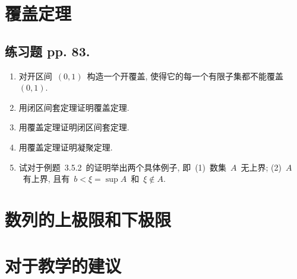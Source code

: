 \documentclass[UTF8,a4paper,11pt,twoside]{book}
\begin{document}
\section{覆盖定理}
\subsection{练习题 pp. 83.}
\begin{enumerate}
	\item 对开区间~$(0,1)$~构造一个开覆盖, 使得它的每一个有限子集都不能覆盖~$(0,1)$.

	\item 用闭区间套定理证明覆盖定理.

	\item 用覆盖定理证明闭区间套定理.

	\item 用覆盖定理证明凝聚定理.

	\item 试对于例题~3.5.2~的证明举出两个具体例子, 即~(1)~数集~$A$~无上界; (2)~$A$~有上界, 且有~$b<\xi=\sup{A}$~和~$\xi\notin A$.
\end{enumerate}

\section{数列的上极限和下极限}

\section{对于教学的建议}
\end{document}
